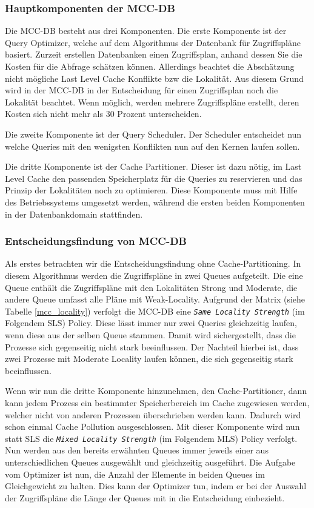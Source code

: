 \subsubsection*{Hauptkomponenten der MCC-DB}
Die MCC-DB besteht aus drei Komponenten. Die erste Komponente ist der Query Optimizer, welche auf dem Algorithmus der Datenbank für Zugriffspläne basiert. Zurzeit erstellen Datenbanken einen Zugriffsplan, anhand dessen Sie die Kosten für die Abfrage schätzen können. Allerdings beachtet die Abschätzung nicht mögliche Last Level Cache Konflikte bzw die Lokalität. Aus diesem Grund wird in der MCC-DB in der Entscheidung für einen Zugriffsplan noch die Lokalität beachtet. Wenn möglich, werden mehrere Zugriffspläne erstellt, deren Kosten sich nicht mehr als 30 Prozent unterscheiden.

Die zweite Komponente ist der Query Scheduler. Der Scheduler entscheidet nun welche Queries mit den wenigsten Konflikten nun auf den Kernen laufen sollen.

Die dritte Komponente ist der Cache Partitioner. Dieser ist dazu nötig, im Last Level Cache den passenden Speicherplatz für die Queries zu reservieren und das Prinzip der Lokalitäten noch zu optimieren. Diese Komponente muss mit Hilfe des Betriebssystems umgesetzt werden, während die ersten beiden Komponenten in der Datenbankdomain stattfinden.

\subsubsection*{Entscheidungsfindung von MCC-DB}
Als erstes betrachten wir die Entscheidungsfindung ohne Cache-Partitioning. In diesem Algorithmus werden die Zugriffspläne in zwei Queues aufgeteilt. Die eine Queue enthält die Zugriffspläne mit den Lokalitäten Strong und Moderate, die andere Queue umfasst alle Pläne mit Weak-Locality. Aufgrund der Matrix (siehe Tabelle \ref{mcc_locality}) verfolgt die MCC-DB eine \texttt{\textit{Same Locality Strength}} (im Folgendem SLS) Policy. Diese lässt immer nur zwei Queries gleichzeitig laufen, wenn diese aus der selben Queue stammen. Damit wird sichergestellt, dass die Prozesse sich gegenseitig nicht stark beeinflussen. Der Nachteil hierbei ist, dass zwei Prozesse mit Moderate Locality laufen können, die sich gegenseitig stark beeinflussen.

Wenn wir nun die dritte Komponente hinzunehmen, den Cache-Partitioner, dann kann jedem Prozess ein bestimmter Speicherbereich im Cache zugewiesen werden, welcher nicht von anderen Prozessen überschrieben werden kann. Dadurch wird schon einmal Cache Pollution ausgeschlossen. Mit dieser Komponente wird nun statt SLS die \texttt{\textit{Mixed Locality Strength}} (im Folgendem MLS) Policy verfolgt. Nun werden aus den bereits erwähnten Queues immer jeweils einer aus unterschiedlichen Queues ausgewählt und gleichzeitig ausgeführt. Die Aufgabe vom Optimizer ist nun, die Anzahl der Elemente in beiden Queues im Gleichgewicht zu halten. Dies kann der Optimizer tun, indem er bei der Auswahl der Zugriffspläne die Länge der Queues mit in die Entscheidung einbezieht.

